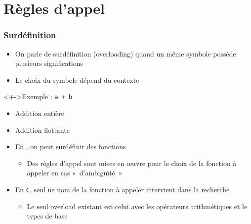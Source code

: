 \section{Règles d'appel}

\begin{frame}
\frametitle{Surdéfinition}
\begin{itemize}[<+->]
\item On parle de surdéfinition (overloading) quand un même symbole possède plusieurs significations
\item Le choix du symbole dépend du contexte
\end{itemize}
\begin{exampleblock}<+->{Exemple : \texttt{a + b}}
	\begin{itemize}[<+->]
	\item Addition entière
	\item Addition flottante
	\end{itemize}
\end{exampleblock}
\begin{itemize}[<+->]
\item En \cpp, on peut surdéfinir des fonctions
	\begin{itemize}
	\item Des règles d'appel sont mises en œuvre pour le choix de la fonction à appeler en cas «~d'ambiguïté~»
	\end{itemize}
\item En \texttt{C}, seul ne nom de la fonction à appeler intervient dans la recherche
	\begin{itemize}
	\item Le seul overload existant est celui avec les opérateurs arithmétiques et le types de base
	\end{itemize}
\end{itemize}
\end{frame}

